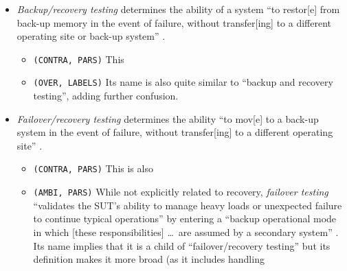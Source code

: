 \begin{itemize}
    \item \emph{Backup/recovery testing} determines the ability of a system
          ``to restor[e] from back-up memory in the event of failure, without
          transfer[ing] to a different operating site or back-up system''
          \citep[p.~37]{IEEE2021c}.
          \begin{itemize}
              \item \texttt{(CONTRA, PARS)}
                    This \subDRT{}
              \item \texttt{(OVER, LABELS)}
                    Its name is also quite similar to ``backup and
                    recovery testing'', adding further confusion.
          \end{itemize}
    \item \emph{Failover/recovery testing} determines the
          ability ``to mov[e] to a back-up system in the event of failure,
          without transfer[ing] to a different operating site''
          \citep[p.~37]{IEEE2021c}.
          \begin{itemize}
              \item \texttt{(CONTRA, PARS)}
                    This is also \subDRT*{}
              \item \texttt{(AMBI, PARS)}
                    While not explicitly related to recovery, \emph{failover
                        testing} ``validates the SUT's ability to manage heavy
                    loads or unexpected failure to continue typical operations''
                    \citep[p.~5\=/9]{SWEBOK2024} by entering a ``backup
                    operational mode in which [these responsibilities] \dots\
                    are assumed by a secondary system'' \citepISTQB{}. Its name
                    implies that it is a child of ``failover/recovery testing''
                    but its definition makes it more broad (as it includes handling

\end{itemize}
\end{itemize}
